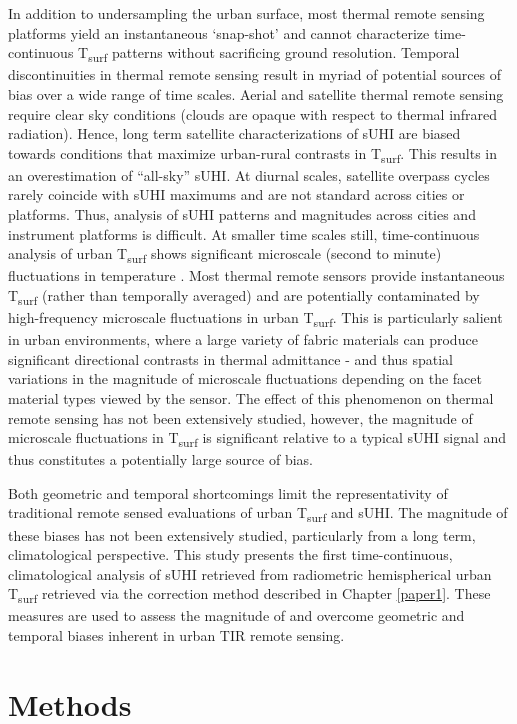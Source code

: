In addition to undersampling the urban surface, most thermal remote sensing platforms yield an instantaneous ‘snap-shot’ and cannot characterize time-continuous T\textsubscript{surf} patterns without sacrificing ground resolution. Temporal discontinuities in thermal remote sensing result in myriad of potential sources of bias over a wide range of time scales. Aerial and satellite thermal remote sensing require clear sky conditions (clouds are opaque with respect to thermal infrared radiation). Hence, long term satellite characterizations of sUHI are biased towards conditions that maximize urban-rural contrasts in T\textsubscript{surf}. This results in an overestimation of “all-sky” sUHI. At diurnal scales, satellite overpass cycles rarely coincide with sUHI maximums and are not standard across cities or platforms. Thus, analysis of sUHI patterns and magnitudes across cities and instrument platforms is difficult. At smaller time scales still, time-continuous analysis of urban T\textsubscript{surf} shows significant microscale (second to minute) fluctuations in temperature \cite{Christen2012}. Most thermal remote sensors provide instantaneous T\textsubscript{surf} (rather than temporally averaged) and are potentially contaminated by high-frequency microscale fluctuations in urban T\textsubscript{surf}. This is particularly salient in urban environments, where a large variety of fabric materials can produce significant directional contrasts in thermal admittance - and thus spatial variations in the magnitude of microscale fluctuations depending on the facet material types viewed by the sensor. The effect of this phenomenon on thermal remote sensing has not been extensively studied, however, the magnitude of microscale fluctuations in T\textsubscript{surf} is significant relative to a typical sUHI signal and thus constitutes a potentially large source of bias.

Both geometric and temporal shortcomings limit the representativity of traditional remote sensed evaluations of urban T\textsubscript{surf} and sUHI. The magnitude of these biases has not been extensively studied, particularly from a long term, climatological perspective. This study presents the first time-continuous, climatological analysis of sUHI retrieved from radiometric hemispherical urban T\textsubscript{surf} retrieved via the correction method described in Chapter \ref{paper1}. These measures are used to assess the magnitude of and overcome geometric and temporal biases inherent in urban TIR remote sensing.

\section{Methods}

